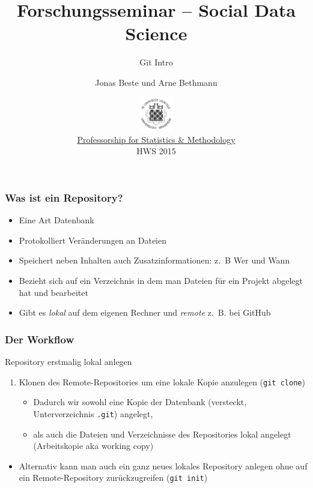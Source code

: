 \documentclass{beamer}
\title{Forschungsseminar -- Social Data Science}
\subtitle{Git Intro}
\author[Beste \& Bethmann]{Jonas Beste und Arne Bethmann}
\date{\includegraphics[height=1.5cm]{../../img/150px-Uni_Mannheim_Siegel.png} \\
  \href{http://sswml.uni-mannheim.de/}{Professorship for Statistics \& Methodology} \\
  HWS 2015}
\begin{document}
\begin{frame}
  \titlepage
\end{frame}


\begin{frame}
  \frametitle{Was ist ein Repository?}
  \begin{itemize}
    \item Eine Art Datenbank
    \item Protokolliert Veränderungen an Dateien
    \item Speichert neben Inhalten auch Zusatzinformationen: z.~B Wer und Wann
    \item Bezieht sich auf ein Verzeichnis in dem man Dateien für ein Projekt abgelegt hat und bearbeitet
    \item Gibt es \emph{lokal} auf dem eigenen Rechner und \emph{remote} z.~B. bei GitHub
  \end{itemize}
\end{frame}


\begin{frame}
  \frametitle{Der Workflow}
  \begin{block}{Repository erstmalig lokal anlegen}
  \begin{enumerate}
    \item Klonen des Remote-Repositories um eine lokale Kopie anzulegen (\texttt{git clone})
    \begin{itemize}
    \item Dadurch wir sowohl eine Kopie der Datenbank (versteckt, Unterverzeichnis \texttt{.git}) angelegt,
    \item als auch die Dateien und Verzeichnisse des Repositories lokal angelegt (Arbeitskopie aka working copy)
    \end{itemize}
  \end{enumerate}
  \begin{itemize}
  \item Alternativ kann man auch ein ganz neues lokales Repository anlegen ohne auf ein Remote-Repository zurückzugreifen (\texttt{git init})
  \end{itemize}
  \end{block}
\end{frame}
\end{document}
